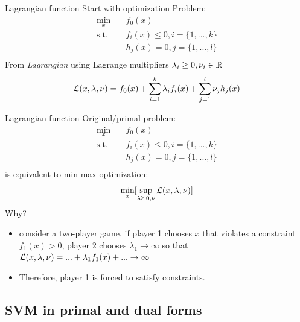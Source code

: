 \documentclass[notes]{beamer}
\begin{document}
\begin{frame}{Lagrangian function}
	Start with optimization Problem:
	\begin{equation}
		\begin{aligned}
			\min_x \quad        & f_0(x)                        \\
			\textrm{s.t.} \quad & f_i(x) \le 0, i = \{1,...,k\} \\
			\quad               & h_j(x) = 0, j = \{1,...,l\}   \\
		\end{aligned}
	\end{equation}
	From \emph{Lagrangian} using Lagrange multipliers $\lambda_i \ge 0, \nu_i \in {\mathbb{R}}$
	\begin{equation}
		\mathcal{L}(x,\lambda,\nu) = f_0(x)+\sum_{i=1}^{k} \lambda_i f_i(x) + \sum_{j=1}^{l} \nu_j h_j (x)
	\end{equation}
\end{frame}

\begin{frame}
	{Lagrangian function}
	Original/primal problem:
	\begin{equation*}
		\begin{aligned}
			\min_x \quad        & f_0(x)                        \\
			\textrm{s.t.} \quad & f_i(x) \le 0, i = \{1,...,k\} \\
			\quad               & h_j(x) = 0, j = \{1,...,l\}   \\
		\end{aligned}
	\end{equation*}
	is equivalent to min-max optimization:
	\[\min_x [\sup_{\lambda \succeq 0, \nu} \mathcal{L}(x,\lambda, \nu)] \]
	Why?
	\pause
	\begin{itemize}
		\item consider a two-player game, if player 1 chooses $x$ that violates a constraint $f_1(x)>0$, player 2 chooses $\lambda_1 \rightarrow \infty$ so that $\mathcal{L} (x,\lambda,\nu)=...+\lambda_1 f_1(x)+... \rightarrow \infty $
		\item Therefore, player 1 is forced to satisfy constraints.
	\end{itemize}
\end{frame}

\subsection{SVM in primal and dual forms}
\end{document}
